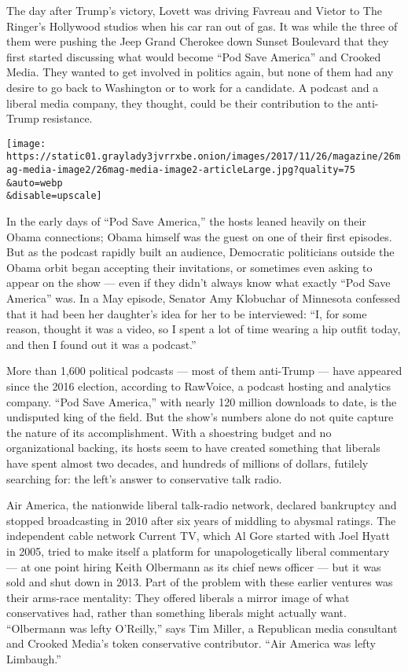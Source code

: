 The day after Trump's victory, Lovett was driving Favreau and Vietor to
The Ringer's Hollywood studios when his car ran out of gas. It was while
the three of them were pushing the Jeep Grand Cherokee down Sunset
Boulevard that they first started discussing what would become ``Pod
Save America'' and Crooked Media. They wanted to get involved in
politics again, but none of them had any desire to go back to Washington
or to work for a candidate. A podcast and a liberal media company, they
thought, could be their contribution to the anti-Trump resistance.

\texttt{[image: https://static01.graylady3jvrrxbe.onion/images/2017/11/26/magazine/26mag-media-image2/26mag-media-image2-articleLarge.jpg?quality=75\\\&auto=webp\\\&disable=upscale]}

In the early days of ``Pod Save America,'' the hosts leaned heavily on
their Obama connections; Obama himself was the guest on one of their
first episodes. But as the podcast rapidly built an audience, Democratic
politicians outside the Obama orbit began accepting their invitations,
or sometimes even asking to appear on the show --- even if they didn't
always know what exactly ``Pod Save America'' was. In a May episode,
Senator Amy Klobuchar of Minnesota confessed that it had been her
daughter's idea for her to be interviewed: ``I, for some reason, thought
it was a video, so I spent a lot of time wearing a hip outfit today, and
then I found out it was a podcast.''

More than 1,600 political podcasts --- most of them anti-Trump --- have
appeared since the 2016 election, according to RawVoice, a podcast
hosting and analytics company. ``Pod Save America,'' with nearly 120
million downloads to date, is the undisputed king of the field. But the
show's numbers alone do not quite capture the nature of its
accomplishment. With a shoestring budget and no organizational backing,
its hosts seem to have created something that liberals have spent almost
two decades, and hundreds of millions of dollars, futilely searching
for: the left's answer to conservative talk radio.

Air America, the nationwide liberal talk-radio network, declared
bankruptcy and stopped broadcasting in 2010 after six years of middling
to abysmal ratings. The independent cable network Current TV, which Al
Gore started with Joel Hyatt in 2005, tried to make itself a platform
for unapologetically liberal commentary --- at one point hiring Keith
Olbermann as its chief news officer --- but it was sold and shut down in
2013. Part of the problem with these earlier ventures was their
arms-race mentality: They offered liberals a mirror image of what
conservatives had, rather than something liberals might actually want.
``Olbermann was lefty O'Reilly,'' says Tim Miller, a Republican media
consultant and Crooked Media's token conservative contributor. ``Air
America was lefty Limbaugh.''

